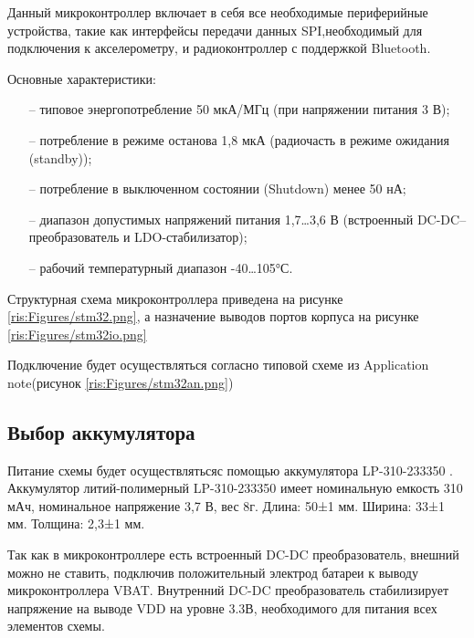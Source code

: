 \begin{sloppypar}
Данный микроконтроллер включает в себя все необходимые периферийные устройства, такие как интерфейсы передачи данных SPI,необходимый для подключения к акселерометру, и радиоконтроллер с поддержкой Bluetooth.


Основные характеристики:
\begin{onehalfspace}
	\begin{itemize}
		\item[--] типовое энергопотребление 50 мкА/МГц (при напряжении питания 3 В);
		\item[--] потребление в режиме останова 1,8 мкА (радиочасть в режиме ожидания (standby));
		\item[--] потребление в выключенном состоянии (Shutdown) менее 50 нА;
		\item[--] диапазон допустимых напряжений питания 1,7…3,6 В (встроенный DC-DC–преобразователь и LDO-стабилизатор);
		\item[--] рабочий температурный диапазон -40…105°С.
	\end{itemize}
\end{onehalfspace}


Структурная схема микроконтроллера приведена на рисунке \ref{ris:Figures/stm32.png}, а назначение выводов портов корпуса на рисунке \ref{ris:Figures/stm32io.png}



Подключение будет осуществляться согласно типовой схеме из Application note\cite {STM_an}(рисунок \ref{ris:Figures/stm32an.png})


\subsection{Выбор аккумулятора}
Питание схемы будет осуществлятьсяс помощью аккумулятора LP-310-233350 \cite {li-pol}.
Аккумулятор литий-полимерный LP-310-233350 имеет номинальную емкость 310 мАч, номинальное напряжение 3,7 В, вес 8г. Длина: 50±1 мм. Ширина: 33±1 мм. Толщина: 2,3±1 мм. 


Так как в микроконтроллере есть встроенный DC-DC преобразователь, внешний можно не ставить, подключив положительный электрод батареи к выводу микроконтроллера VBAT. Внутренний DC-DC преобразователь стабилизирует напряжение на выводе VDD на уровне 3.3В, необходимого для питания всех элементов схемы.



\end{sloppypar}
